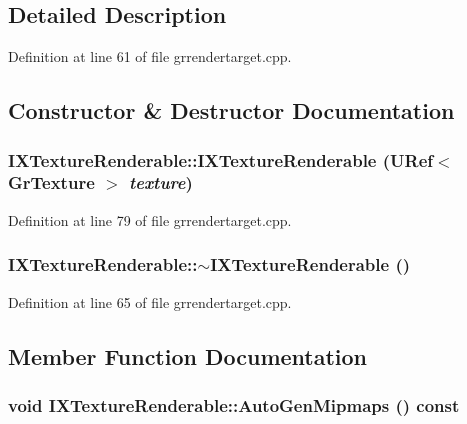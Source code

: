 \subsection{Detailed Description}


Definition at line 61 of file grrendertarget.cpp.

\subsection{Constructor \& Destructor Documentation}
\hypertarget{class_i_x_texture_renderable_36bd2cf25c36fadfc244c0fe016664f2}{
\subsubsection[{IXTextureRenderable}]{\setlength{\rightskip}{0pt plus 5cm}IXTextureRenderable::IXTextureRenderable ({\bf URef}$<$ {\bf GrTexture} $>$ {\em texture})}}
\label{class_i_x_texture_renderable_36bd2cf25c36fadfc244c0fe016664f2}




Definition at line 79 of file grrendertarget.cpp.\hypertarget{class_i_x_texture_renderable_636040ae8fb29015517c25b71d2a2d02}{
\subsubsection[{$\sim$IXTextureRenderable}]{\setlength{\rightskip}{0pt plus 5cm}IXTextureRenderable::$\sim$IXTextureRenderable ()}}
\label{class_i_x_texture_renderable_636040ae8fb29015517c25b71d2a2d02}




Definition at line 65 of file grrendertarget.cpp.

\subsection{Member Function Documentation}
\hypertarget{class_i_x_texture_renderable_192d19327613117b701f34a46025d028}{
\subsubsection[{AutoGenMipmaps}]{\setlength{\rightskip}{0pt plus 5cm}void IXTextureRenderable::AutoGenMipmaps () const}}
\label{class_i_x_texture_renderable_192d19327613117b701f34a46025d028}




